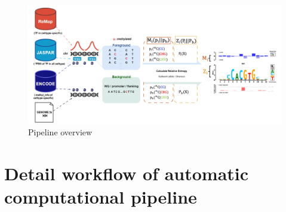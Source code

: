 \documentclass{PHlab-thesis}
\begin{document}
\begin{figure}[H]
	\centering
	\includegraphics[scale=0.5]{figures/OVERVIEW.png}
	\caption{Pipeline overview}
	\label{fig:overview} %
\end{figure}

\section[automatic computational workflow]{Detail workflow of automatic computational pipeline}
\end{document}
